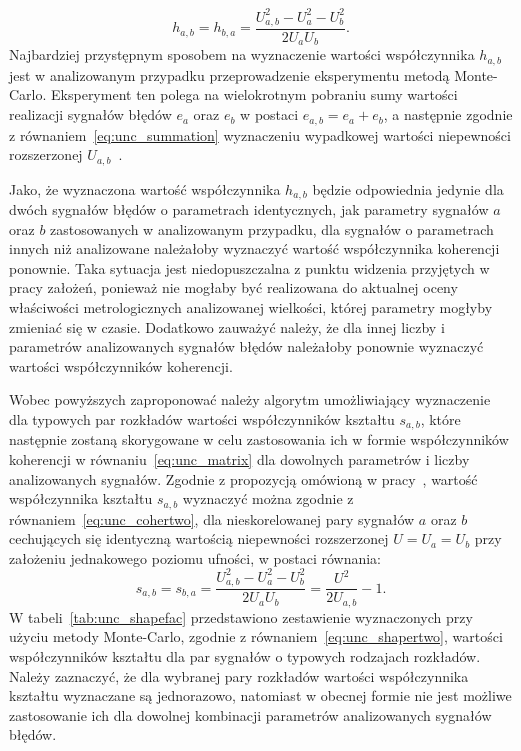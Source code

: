 \begin{equation}
h_{a,b} = h_{b,a} = \frac{U_{a,b}^{2} - U_{a}^{2} - U_{b}^{2}}{2 U_{a} U_{b}} \label{eq:unc_cohertwo}.
\end{equation}
Najbardziej przystępnym sposobem na wyznaczenie wartości współczynnika $h_{a,b}$ jest w analizowanym przypadku przeprowadzenie eksperymentu metodą Monte-Carlo. Eksperyment ten polega na wielokrotnym pobraniu sumy wartości realizacji sygnałów błędów $e_{a}$ oraz $e_{b}$ w postaci $e_{a,b} = e_{a} + e_{b}$, a następnie zgodnie z równaniem~\eqref{eq:unc_summation} wyznaczeniu wypadkowej wartości niepewności rozszerzonej $U_{a,b}$~\cite{jcgm_montecarlo}.

Jako, że wyznaczona wartość współczynnika $h_{a,b}$ będzie odpowiednia jedynie dla dwóch sygnałów błędów o parametrach identycznych, jak parametry sygnałów $a$ oraz $b$ zastosowanych w analizowanym przypadku, dla sygnałów o parametrach innych niż analizowane należałoby wyznaczyć wartość współczynnika koherencji ponownie. Taka sytuacja jest niedopuszczalna z punktu widzenia przyjętych w pracy założeń, ponieważ nie mogłaby być realizowana do aktualnej oceny właściwości metrologicznych analizowanej wielkości, której parametry mogłyby zmieniać się w czasie. Dodatkowo zauważyć należy, że dla innej liczby i parametrów analizowanych sygnałów błędów należałoby ponownie wyznaczyć wartości współczynników koherencji.

Wobec powyższych zaproponować należy algorytm umożliwiający wyznaczenie dla typowych par rozkładów wartości współczynników kształtu $s_{a,b}$, które następnie zostaną skorygowane w celu zastosowania ich w formie współczynników koherencji w równaniu~\eqref{eq:unc_matrix} dla dowolnych parametrów i liczby analizowanych sygnałów. Zgodnie z propozycją omówioną w pracy~\cite{jakubiec_model}, wartość współczynnika kształtu $s_{a,b}$ wyznaczyć można zgodnie z równaniem~\eqref{eq:unc_cohertwo}, dla nieskorelowanej pary sygnałów $a$ oraz $b$ cechujących się identyczną wartością niepewności rozszerzonej $U = U_{a} = U_{b}$ przy założeniu jednakowego poziomu ufności, w postaci równania:
\begin{equation}
s_{a,b} = s_{b,a} = \frac{U_{a,b}^{2} - U_{a}^{2} - U_{b}^{2}}{2 U_{a} U_{b}} = \frac{U^{2}}{2 U_{a,b}} - 1 \label{eq:unc_shapertwo}.
\end{equation}
W tabeli~\ref{tab:unc_shapefac} przedstawiono zestawienie wyznaczonych przy użyciu metody Monte-Carlo, zgodnie z równaniem~\eqref{eq:unc_shapertwo}, wartości współczynników kształtu dla par sygnałów o typowych rodzajach rozkładów. Należy zaznaczyć, że dla wybranej pary rozkładów wartości współczynnika kształtu wyznaczane są jednorazowo, natomiast w obecnej formie nie jest możliwe zastosowanie ich dla dowolnej kombinacji parametrów analizowanych sygnałów błędów.

